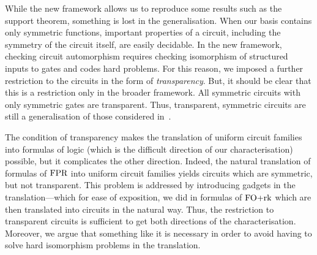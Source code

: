 \documentclass[../paper.tex]{subfiles}
\begin{document}
While the new framework allows us to reproduce some results such as
the support theorem, something is lost in the generalisation.  When
our basis contains only symmetric functions, important properties of
a circuit, including the symmetry of the circuit itself, are easily
decidable.  In the new framework, checking circuit automorphism
requires checking isomorphism of structured inputs to gates and codes
hard problems.  For this reason, we imposed a further restriction to
the circuits in the form of \emph{transparency}.  But, it should be
clear that this is a restriction only in the broader framework.  All
symmetric circuits with only symmetric gates are transparent.  Thus,
transparent, symmetric circuits are still a generalisation of those
considered in~\cite{AndersonD17}.  

The condition of transparency makes the translation of uniform circuit
families into formulas of logic (which is the difficult direction of
our characterisation) possible, but it complicates the other direction.
Indeed, the natural translation of formulas of $\text{\upshape FPR}$ into uniform
circuit families yields circuits which are symmetric, but not
transparent.  This problem is addressed by introducing gadgets in the
translation---which for ease of exposition, we did in formulas of
$\text{\upshape FO+rk}$ which are then translated into circuits in the natural way.
Thus, the restriction to transparent circuits is sufficient to get
both directions of the characterisation.  Moreover, we argue that
something like it is necessary in order to avoid having to solve hard
isomorphism problems in the translation.

\end{document}
